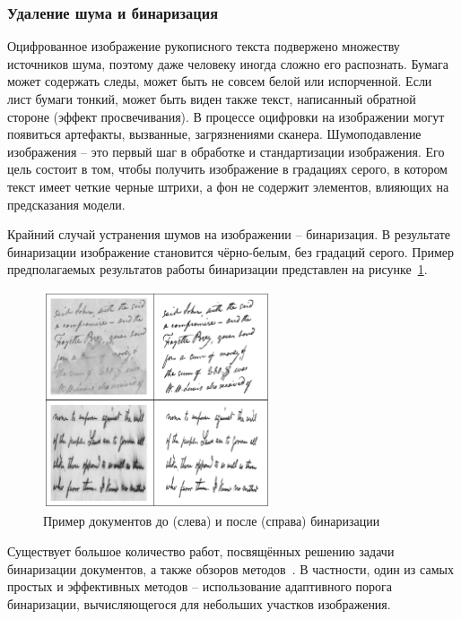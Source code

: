 \subsubsection{Удаление шума и бинаризация}
\label{subsubsec:binarization}

Оцифрованное изображение рукописного текста подвержено множеству источников шума, поэтому даже человеку иногда сложно его распознать.
Бумага может содержать следы, может быть не совсем белой или испорченной.
Если лист бумаги тонкий, может быть виден также текст, написанный обратной стороне (эффект просвечивания).
В процессе оцифровки на изображении могут появиться артефакты, вызванные, загрязнениями сканера.
Шумоподавление изображения -- это первый шаг в обработке и стандартизации изображения.
Его цель состоит в том, чтобы получить изображение в градациях серого, в котором текст имеет четкие черные штрихи,
а фон не содержит элементов, влияющих на предсказания модели.

Крайний случай устранения шумов на изображении -- бинаризация.
В результате бинаризации изображение становится чёрно-белым, без градаций серого.
Пример предполагаемых результатов работы бинаризации представлен на рисунке~\ref{fig:binarization}.
\begin{figure}[h!]
    \centering
    \includegraphics[width=0.6\textwidth]{img/binarization}
    \caption{Пример документов до (слева) и после (справа) бинаризации}
    \label{fig:binarization}
\end{figure}

Существует большое количество работ, посвящённых решению задачи бинаризации документов, а также обзоров методов~\cite{mustafa2018binarization}.
В частности, один из самых простых и эффективных методов -- использование адаптивного порога бинаризации, вычисляющегося для небольших участков изображения.


